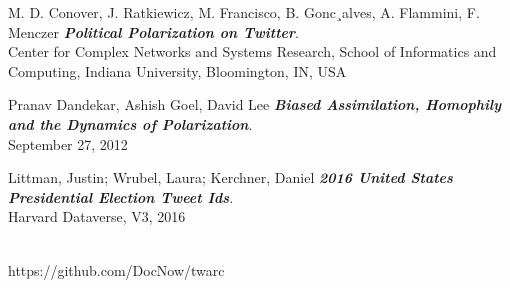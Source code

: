 \documentclass{article}
\begin{document}
\begin{thebibliography}{9}

M. D. Conover, J. Ratkiewicz, M. Francisco, B. Gonc¸alves, A. Flammini, F. Menczer \textit{\textbf{Political Polarization on Twitter}}. \\
Center for Complex Networks and Systems Research, School of Informatics and Computing, Indiana University, Bloomington, IN, USA

Pranav Dandekar, Ashish Goel, David Lee
\textit{\textbf{Biased Assimilation, Homophily and the Dynamics of Polarization}}. \\
September 27, 2012
 
Littman, Justin; Wrubel, Laura; Kerchner, Daniel
\textit{\textbf{2016 United States Presidential Election Tweet Ids}}. \\
Harvard Dataverse, V3, 2016

\textit{}\\
https://github.com/DocNow/twarc

\end{thebibliography}
\end{document}
